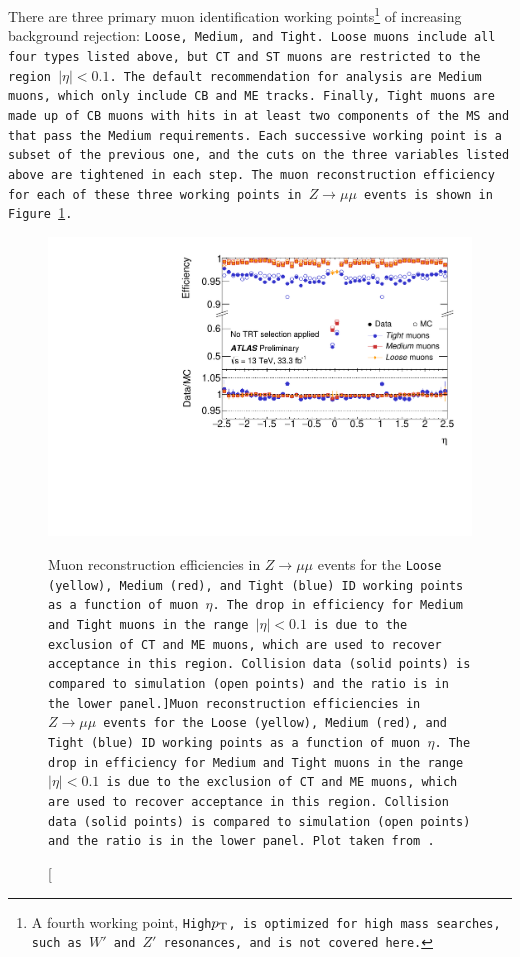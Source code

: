 There are three primary muon identification working points\footnote{A fourth working point, \tt{High$p_{\mathrm{T}}$}, is optimized for high mass searches, such as $W'$ and $Z'$ resonances, and is not covered here.} of increasing background rejection: \tt{Loose}, \tt{Medium}, and \tt{Tight}.
\tt{Loose} muons include all four types listed above, but CT and ST muons are restricted to the region $|\eta| < 0.1$.
The default recommendation for analysis are \tt{Medium} muons, which only include CB and ME tracks.
Finally, \tt{Tight} muons are made up of CB muons with hits in at least two components of the MS and that pass the \tt{Medium} requirements.
Each successive working point is a subset of the previous one, and the cuts on the three variables listed above are tightened in each step.
The muon reconstruction efficiency for each of these three working points in $Z\rightarrow\mu\mu$ events is shown in Figure~\ref{fig:muon_id_efficiency}.

\begin{figure}[htbp]
  \centering
  \includegraphics[width=.6\textwidth]{figs/detector/muon_id_efficiency}
  \caption[Muon reconstruction efficiencies in $Z\rightarrow\mu\mu$ events for the \tt{Loose} (yellow), \tt{Medium} (red), and \tt{Tight} (blue) ID working points as a function of muon $\eta$.  The drop in efficiency for \tt{Medium} and \tt{Tight} muons in the range $|\eta| < 0.1$ is due to the exclusion of CT and ME muons, which are used to recover acceptance in this region.  Collision data (solid points) is compared to simulation (open points) and the ratio is in the lower panel.]{Muon reconstruction efficiencies in $Z\rightarrow\mu\mu$ events for the \tt{Loose} (yellow), \tt{Medium} (red), and \tt{Tight} (blue) ID working points as a function of muon $\eta$.  The drop in efficiency for \tt{Medium} and \tt{Tight} muons in the range $|\eta| < 0.1$ is due to the exclusion of CT and ME muons, which are used to recover acceptance in this region.  Collision data (solid points) is compared to simulation (open points) and the ratio is in the lower panel.  Plot taken from~\cite{2017.muon-cp-plots}.}
  \label{fig:muon_id_efficiency}
\end{figure}

